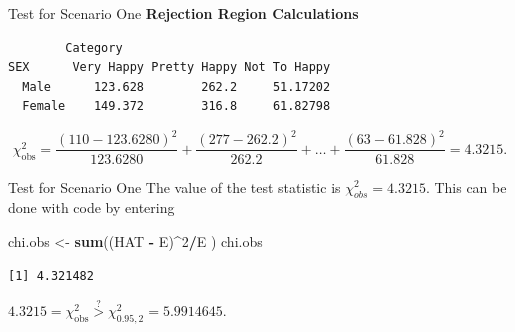 \documentclass[
  ignorenonframetext,
]{beamer}
\newenvironment{Shaded}{\begin{snugshade}}{\end{snugshade}}
\newcommand{\DecValTok}[1]{\textcolor[rgb]{0.00,0.00,0.81}{#1}}
\newcommand{\FunctionTok}[1]{\textcolor[rgb]{0.13,0.29,0.53}{\textbf{#1}}}
\newcommand{\NormalTok}[1]{#1}
\newcommand{\OtherTok}[1]{\textcolor[rgb]{0.56,0.35,0.01}{#1}}
\newcommand{\SpecialCharTok}[1]{\textcolor[rgb]{0.81,0.36,0.00}{\textbf{#1}}}
\begin{document}
\begin{frame}[fragile]{Test for Scenario One}
\protect\hypertarget{test-for-scenario-one-3}{}
\textbf{Rejection Region Calculations}

\begin{Shaded}
\end{Shaded}

\begin{verbatim}
        Category
SEX      Very Happy Pretty Happy Not To Happy
  Male      123.628        262.2     51.17202
  Female    149.372        316.8     61.82798
\end{verbatim}

\[\chi^2_{\text{obs}}=\frac{(110 - 123.6280)^2}{123.6280} +
\frac{(277-262.2)^2}{262.2}+ \dots +\frac{(63-61.828)^2}{61.828}=4.3215.\]
\end{frame}

\begin{frame}[fragile]{Test for Scenario One}
\protect\hypertarget{test-for-scenario-one-4}{}
The value of the test statistic is \(\chi^2_{obs}=4.3215\). This can be
done with code by entering

\begin{Shaded}
\begin{Highlighting}[]
\NormalTok{chi.obs }\OtherTok{\textless{}{-}} \FunctionTok{sum}\NormalTok{((HAT }\SpecialCharTok{{-}}\NormalTok{ E)}\SpecialCharTok{\^{}}\DecValTok{2}\SpecialCharTok{/}\NormalTok{E )}
\NormalTok{chi.obs}
\end{Highlighting}
\end{Shaded}

\begin{verbatim}
[1] 4.321482
\end{verbatim}

\(4.3215 = \chi^2_{\text{obs}} \overset{?}{>} \chi^2_{0.95,2}= 5.9914645\).
\end{frame}
\end{document}
